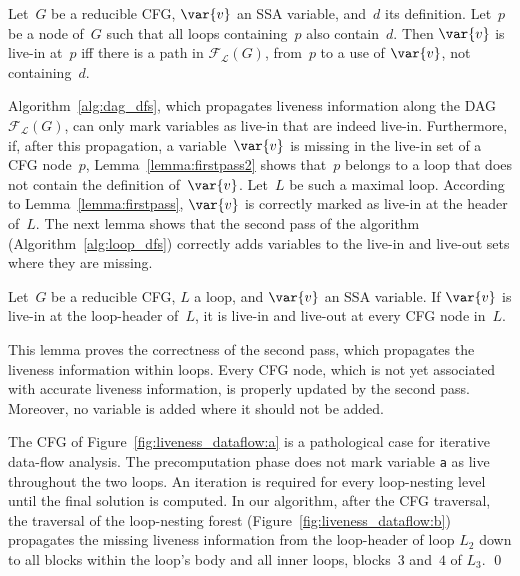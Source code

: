 \begin{lemma}
	\label{lemma:firstpass2}
	Let~$G$ be a reducible CFG, $\var{v}$ an SSA variable, and~$d$ its definition.
	Let~$p$ be a node of~$G$ such that all loops containing~$p$ also contain~$d$.
	Then $\var{v}$ is live-in at~$p$ iff there is a path in $\mathcal{F}_\mathcal{L}(G)$, from~$p$ to a use of $\var{v}$, not containing~$d$.
\end{lemma}


Algorithm~\ref{alg:dag_dfs}, which propagates liveness information along the DAG $\mathcal{F}_\mathcal{L}(G)$, can only mark variables as live-in that are indeed live-in.
Furthermore, if, after this propagation, a variable~$\var{v}$ is missing in the live-in set of a CFG node~$p$, Lemma~\ref{lemma:firstpass2} shows that~$p$ belongs to a loop that does not contain the definition of~$\var{v}$.
Let~$L$ be such a maximal loop.
According to Lemma~\ref{lemma:firstpass}, $\var{v}$ is correctly marked as live-in at the header of~$L$.
The next lemma shows that the second pass of the algorithm (Algorithm~\ref{alg:loop_dfs}) correctly adds variables to the live-in and live-out sets where they are missing.

\begin{lemma}
	\label{lemma:secondpass}
	Let~$G$ be a reducible CFG, $L$ a loop, and $\var{v}$ an SSA variable.
	If $\var{v}$ is live-in at the loop-header of~$L$, it is live-in and live-out at every CFG node in~$L$.
\end{lemma}


This lemma proves the correctness of the second pass, which propagates the liveness information within loops.
Every CFG node, which is not yet associated with accurate liveness information, is properly updated by the second pass.
Moreover, no variable is added where it should not be added.

\begin{example}
	The CFG of Figure~\ref{fig:liveness_dataflow:a} is a pathological case for iterative data-flow analysis.
	The precomputation phase does not mark variable \texttt{a} as live throughout the two loops.
	An iteration is required for every loop-nesting level until the \pagebreak final solution is computed.
	In our algorithm, after the CFG traversal, the traversal of the loop-nesting forest (Figure~\ref{fig:liveness_dataflow:b}) propagates the missing liveness information from the loop-header of loop $L_2$ down to all blocks within the loop's body and all inner loops, \ie blocks~$3$ and~$4$ of $L_3$.
\qed \end{example}

